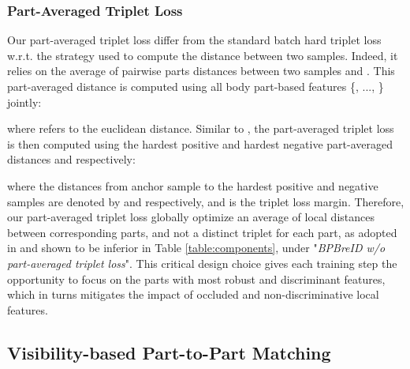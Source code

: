 \documentclass[10pt,twocolumn,letterpaper]{article}
\begin{document}
\subsubsection{Part-Averaged Triplet Loss} \label{section:part_triplet_loss}
Our part-averaged triplet loss differ from the standard batch hard triplet loss \cite{triplet} w.r.t. the strategy used to compute the distance between two samples.
Indeed, it relies on the average of pairwise parts distances between two samples  and . 
This part-averaged distance is computed using all body part-based features \{, ..., \} jointly:
{\small{

}}
where  refers to the euclidean distance.
Similar to \cite{triplet}, the part-averaged triplet loss is then computed using the hardest positive and hardest negative part-averaged distances  and  respectively:
{\small{

}}
where the distances from anchor sample to the hardest positive and negative samples are denoted by  and  respectively, and  is the triplet loss margin.
Therefore, our part-averaged triplet loss globally optimize an average of local distances between corresponding parts, and not a distinct triplet for each part, as adopted in \cite{HOReID, PAT} and shown to be inferior in Table \ref{table:components}, under "\textit{BPBreID w/o part-averaged triplet loss}".
This critical design choice gives each training step the opportunity to focus on the parts with most robust and discriminant features, which in turns mitigates the impact of occluded and non-discriminative local features.




 










                                           


\subsection{Visibility-based Part-to-Part Matching} \label{section:testing}
\end{document}
